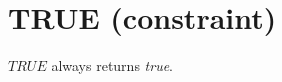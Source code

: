 \label{true}
\hypertarget{true}{}

\section{TRUE (constraint)}\label{true:trueconstraint}\hypertarget{true:trueconstraint}{}
\(TRUE\) always returns \emph{true}.

